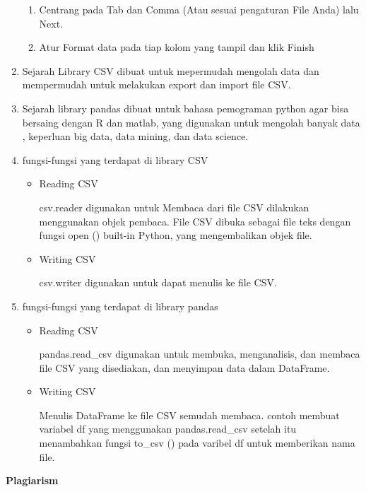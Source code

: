 \begin{enumerate}
\begin{enumerate}
        \item Centrang pada Tab dan Comma (Atau sesuai pengaturan File Anda) lalu Next.
        \item Atur Format data pada tiap kolom yang tampil dan klik Finish
    \end{enumerate}
    \item Sejarah Library CSV  dibuat untuk mepermudah mengolah data dan mempermudah untuk melakukan export dan import file CSV.
    \item Sejarah library pandas dibuat untuk bahasa pemograman python agar bisa bersaing dengan  R dan matlab, yang digunakan untuk mengolah banyak data , keperluan big data, data mining, dan data science.
    \item fungsi-fungsi yang terdapat di library CSV
    \begin{itemize}
        \item Reading CSV
        \par csv.reader digunakan untuk Membaca dari file CSV dilakukan menggunakan objek pembaca. File CSV dibuka sebagai file teks dengan fungsi open () built-in Python, yang mengembalikan objek file.
        \item Writing CSV
        \par csv.writer digunakan untuk dapat menulis ke file CSV.
    \end{itemize}
    \item fungsi-fungsi yang terdapat di library pandas
    \begin{itemize}
        \item Reading CSV
        \par pandas.read\_csv digunakan untuk membuka, menganalisis, dan membaca file CSV yang disediakan, dan menyimpan data dalam DataFrame.
        \item Writing CSV
        \par  Menulis DataFrame ke file CSV semudah membaca. contoh membuat variabel df yang menggunakan pandas.read\_csv setelah itu menambahkan fungsi to\_csv () pada varibel df untuk memberikan nama file.
    \end{itemize}
    
\end{enumerate}
\textbf{ Plagiarism}


